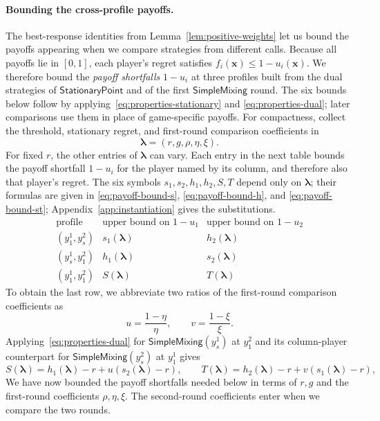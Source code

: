 \documentclass[11pt]{article}
\theoremstyle{remark}
\theoremstyle{plain}
\newcommand{\sm}{\mathsf{SimpleMixing}}
\newcommand{\spoint}{\mathsf{StationaryPoint}}
\begin{document}
\paragraph{Bounding the cross-profile payoffs.}
The best-response identities from Lemma~\ref{lem:positive-weights}
let us bound the payoffs appearing when we compare strategies from
different calls. Because all payoffs lie in $[0,1]$, each player's
regret satisfies $f_i(\boldsymbol x)\le1-u_i(\boldsymbol x)$.
We therefore bound the \emph{payoff shortfalls} $1-u_i$ at three
profiles built from the dual strategies of $\spoint$ and of the
first $\sm$ round. The six bounds below follow by
applying~\eqref{eq:properties-stationary} and
\eqref{eq:properties-dual}; later comparisons use them in place
of game-specific payoffs.
For compactness, collect the threshold, stationary regret, and
first-round comparison coefficients in
\begin{equation}
 \boldsymbol\lambda=(r,g,\rho,\eta,\xi).
 \label{eq:payoff-bound-parameters}
\end{equation}
For fixed $r$, the other entries of $\boldsymbol\lambda$ can vary.
Each entry in the next table bounds the payoff shortfall $1-u_i$
for the player named by its column, and therefore also that
player's regret. The six symbols $s_1,s_2,h_1,h_2,S,T$ depend
only on $\boldsymbol\lambda$; their formulas are given in
\eqref{eq:payoff-bound-s}, \eqref{eq:payoff-bound-h}, and
\eqref{eq:payoff-bound-st}; Appendix~\ref{app:instantiation}
gives the substitutions.
\begin{equation}
 \begin{array}{c|cc}
 \text{profile}&\text{upper bound on }1-u_1&\text{upper bound on }1-u_2\\ \hline
 (y_1^1,y_s^2)&s_1(\boldsymbol\lambda)&h_2(\boldsymbol\lambda)\\
 (y_s^1,y_1^2)&h_1(\boldsymbol\lambda)&s_2(\boldsymbol\lambda)\\
 (y_1^1,y_1^2)&S(\boldsymbol\lambda)&T(\boldsymbol\lambda)
 \end{array}
 \label{eq:main-payoff-bounds}
\end{equation}
To obtain the last row, we abbreviate two ratios
of the first-round comparison coefficients as
\begin{equation}
 u=\frac{1-\eta}{\eta},\qquad v=\frac{1-\xi}{\xi}.
 \label{eq:main-relative-weights}
\end{equation}
Applying~\eqref{eq:properties-dual} for $\sm(y_s^1)$ at
$y_1^2$ and its column-player counterpart for $\sm(y_s^2)$ at
$y_1^1$ gives
\begin{equation}
 S(\boldsymbol\lambda)=h_1(\boldsymbol\lambda)-r+u(s_2(\boldsymbol\lambda)-r),\qquad
 T(\boldsymbol\lambda)=h_2(\boldsymbol\lambda)-r+v(s_1(\boldsymbol\lambda)-r),
 \label{eq:main-payoff-st}
\end{equation}
We have now bounded the payoff shortfalls needed below in terms of
$r,g$ and the first-round coefficients $\rho,\eta,\xi$. The second-round
coefficients enter when we compare the two rounds.
\end{document}
